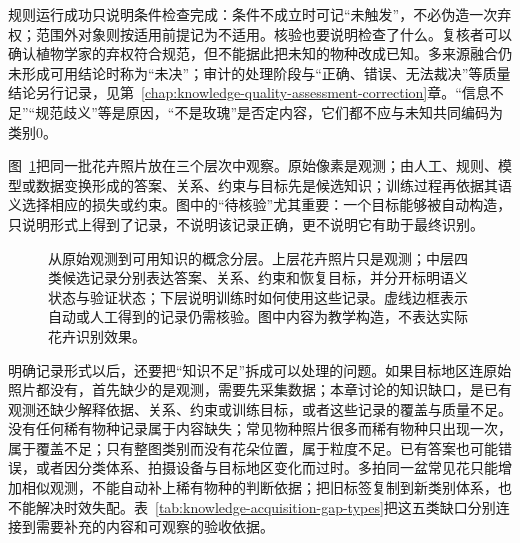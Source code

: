 规则运行成功只说明条件检查完成：条件不成立时可记“未触发”，不必伪造一次弃权；范围外对象则按适用前提记为不适用。核验也要说明检查了什么。复核者可以确认植物学家的弃权符合规范，但不能据此把未知的物种改成已知。多来源融合仍未形成可用结论时称为“未决”；审计的处理阶段与“正确、错误、无法裁决”等质量结论另行记录，见第~\ref{chap:knowledge-quality-assessment-correction}章。“信息不足”“规范歧义”等是原因，“不是玫瑰”是否定内容，它们都不应与未知共同编码为类别0。

图~\ref{fig:knowledge-acquisition-observation-to-knowledge}把同一批花卉照片放在三个层次中观察。原始像素是观测；由人工、规则、模型或数据变换形成的答案、关系、约束与目标先是候选知识；训练过程再依据其语义选择相应的损失或约束。图中的“待核验”尤其重要：一个目标能够被自动构造，只说明形式上得到了记录，不说明该记录正确，更不说明它有助于最终识别。

\begin{figure}[htbp]
  \centering
  
  \caption{从原始观测到可用知识的概念分层。上层花卉照片只是观测；中层四类候选记录分别表达答案、关系、约束和恢复目标，并分开标明语义状态与验证状态；下层说明训练时如何使用这些记录。虚线边框表示自动或人工得到的记录仍需核验。图中内容为教学构造，不表达实际花卉识别效果。}
  \label{fig:knowledge-acquisition-observation-to-knowledge}
\end{figure}

明确记录形式以后，还要把“知识不足”拆成可以处理的问题。如果目标地区连原始照片都没有，首先缺少的是观测，需要先采集数据；本章讨论的知识缺口，是已有观测还缺少解释依据、关系、约束或训练目标，或者这些记录的覆盖与质量不足。没有任何稀有物种记录属于内容缺失；常见物种照片很多而稀有物种只出现一次，属于覆盖不足；只有整图类别而没有花朵位置，属于粒度不足。已有答案也可能错误，或者因分类体系、拍摄设备与目标地区变化而过时。多拍同一盆常见花只能增加相似观测，不能自动补上稀有物种的判断依据；把旧标签复制到新类别体系，也不能解决时效失配。表~\ref{tab:knowledge-acquisition-gap-types}把这五类缺口分别连接到需要补充的内容和可观察的验收依据。


